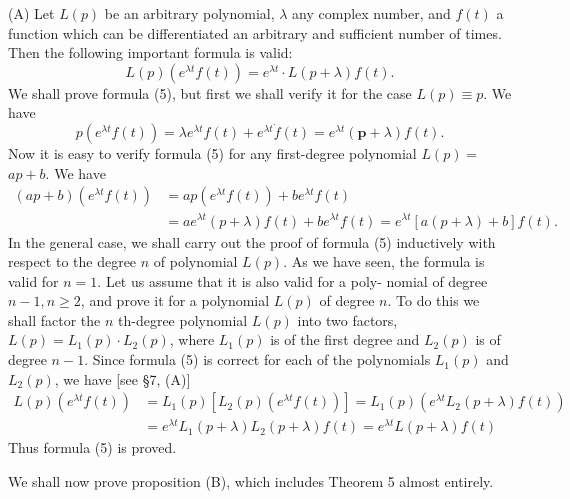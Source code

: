 \documentclass[10pt,a5paper]{book}
\theoremstyle{plain}
\theoremstyle{definition}
\theoremstyle{remark}
\begin{document}
(A) Let $L(p)$ be an arbitrary polynomial, $\lambda$ any complex number, and $f(t)$ a function which can be differentiated an arbitrary and sufficient number of times. Then the following important formula is valid:
\begin{equation*}
L(p)\left(e^{\lambda t} f(t)\right)=e^{\lambda t} \cdot L(p+\lambda) f(t) . \tag{5}
\end{equation*}
We shall prove formula (5), but first we shall verify it for the case $L(p) \equiv p$. We have
\[
p\left(e^{\lambda t} f(t)\right)=\lambda e^{\lambda t} f(t)+e^{\lambda t} \dot{f}(t)=e^{\lambda t}(\boldsymbol{p}+\lambda) f(t) .
\]
Now it is easy to verify formula (5) for any first-degree polynomial $L(p)=$ $a p+b$. We have
\[
\begin{aligned}
(a p+b)\left(e^{\lambda t} f(t)\right) & =a p\left(e^{\lambda t} f(t)\right)+b e^{\lambda t} f(t) \\
& =a e^{\lambda t}(p+\lambda) f(t)+b e^{\lambda t} f(t)=e^{\lambda t}[a(p+\lambda)+b] f(t) .
\end{aligned}
\]
In the general case, we shall carry out the proof of formula (5) inductively with respect to the degree $n$ of polynomial $L(p)$. As we have seen, the formula is valid for $n=1$. Let us assume that it is also valid for a poly-
nomial of degree $n-1, n \geq 2$, and prove it for a polynomial $L(p)$ of degree $n$. To do this we shall factor the $n$ th-degree polynomial $L(p)$ into two factors, $L(p)=L_{1}(p) \cdot L_{2}(p)$, where $L_{1}(p)$ is of the first degree and $L_{2}(p)$ is of degree $n-1$. Since formula (5) is correct for each of the polynomials $L_{1}(p)$ and $L_{2}(p)$, we have [see §7, (A)]
\[
\begin{aligned}
L(p)\left(e^{\lambda t} f(t)\right) & =L_{1}(p)\left[L_{2}(p)\left(e^{\lambda t} f(t)\right)\right]=L_{1}(p)\left(e^{\lambda t} L_{2}(p+\lambda) f(t)\right) \\
& =e^{\lambda t} L_{1}(p+\lambda) L_{2}(p+\lambda) f(t)=e^{\lambda t} L(p+\lambda) f(t)
\end{aligned}
\]
Thus formula (5) is proved.

We shall now prove proposition (B), which includes Theorem 5 almost entirely.
\end{document}
